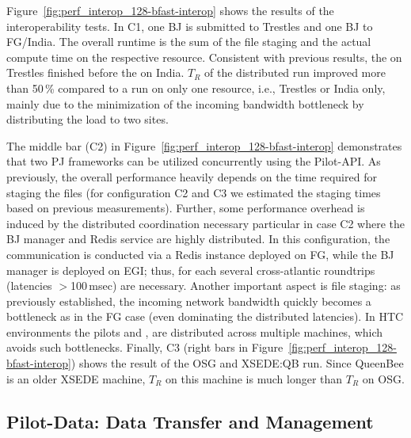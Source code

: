 \documentclass[conference]{IEEEtran}
\begin{document}

Figure~\ref{fig:perf_interop_128-bfast-interop} shows the results of
the interoperability tests. In C1, one BJ \pilot is submitted to
Trestles and one BJ \pilot to FG/India.  The overall runtime is the
sum of the file staging and the actual compute time on the respective
resource. Consistent with previous results, the \pilot on Trestles
finished before the \pilot on India. $T_R$ of the distributed run
improved more than 50\,\% compared to a run on only one resource,
i.e., Trestles or India only, mainly due to the minimization of the
incoming bandwidth bottleneck by distributing the load to two sites.




The middle bar (C2) in Figure~\ref{fig:perf_interop_128-bfast-interop}
demonstrates that two PJ frameworks can be utilized concurrently using
the Pilot-API. As previously, the overall performance heavily depends
on the time required for staging the files (for configuration C2 and
C3 we estimated the staging times based on previous
measurements). Further, some performance overhead is induced by the
distributed coordination necessary particular in case C2 where the BJ
manager and Redis service are highly distributed. In this
configuration, the communication is conducted via a Redis instance
deployed on FG, while the BJ manager is deployed on EGI; thus, for
each \cu several cross-atlantic roundtrips (latencies $>$100\,msec)
are necessary. Another important aspect is file staging: as previously
established, the incoming network bandwidth quickly becomes a
bottleneck as in the FG case (even dominating the distributed
latencies). In HTC environments the pilots and 
\cus, are distributed across multiple machines, which avoids such
bottlenecks.  Finally, C3 (right bars in
Figure~\ref{fig:perf_interop_128-bfast-interop}) shows the result of
the OSG and XSEDE:QB run. Since QueenBee is an older XSEDE machine,
$T_R$ on this machine is much longer than $T_R$ on OSG.


\subsection{Pilot-Data: Data Transfer and Management}
\label{sec:experiment-pilotdata}
\end{document}
